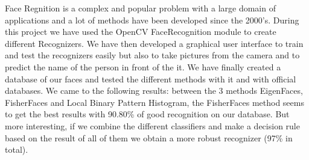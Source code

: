 Face Regnition is a complex and popular problem with a large domain of applications and a lot of methods have been developed since the 
2000's. During this project we have used the OpenCV FaceRecognition module to create different Recognizers. We have then developed a graphical user 
interface to train and test the recognizers easily but also to take pictures from the camera and to predict the name of the person in front of the 
it. We have finally created a database of our faces and tested the different methods with it and with official databases. We came to the 
following results: between the 3 methods EigenFaces, FisherFaces and Local Binary Pattern Histogram, the FisherFaces method seems to get the best 
results with 90.80\% of good recognition on our database. But more interesting, if we combine the different classifiers and make a 
decision rule based on the result of all of them we obtain a more robust recognizer (97\% in total).
